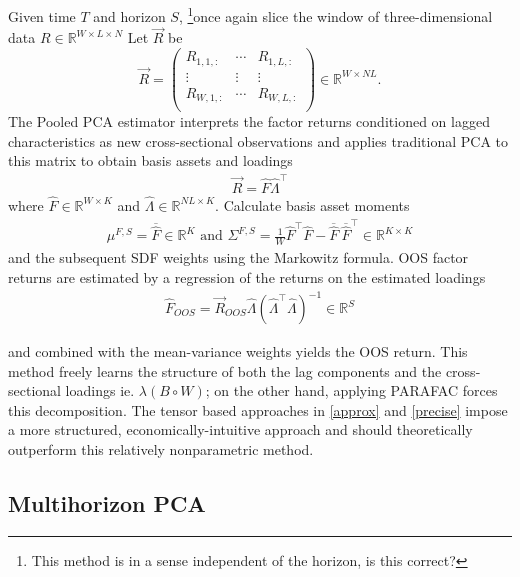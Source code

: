 \documentclass{article}
\newcommand{\R}{{\mathbb R}}
\begin{document}
Given time $T$ and horizon $S$, \footnote{This method is in a sense independent of the horizon, is this correct?}once again slice the window of three-dimensional data $R \in \R^{W \times L \times N}$ Let $\overrightarrow{R}$ be 
\[\overrightarrow{R} = \begin{pmatrix}
R_{1, 1, :} & \cdots & R_{1, L, :}\\
\vdots & \vdots & \vdots\\
R_{W, 1, :} & \cdots & R_{W, L, :}\\
\end{pmatrix}
\in \R^{W \times NL}.\]
The Pooled PCA estimator interprets the factor returns conditioned on lagged characteristics as new 
cross-sectional observations and applies traditional PCA to this matrix to obtain basis assets and loadings
\begin{align}
    \overrightarrow{R} = \widehat{F} \widehat{\Lambda}^\top
\end{align}
where $\widehat{F} \in \R^{W \times K}$ and $\widehat{\Lambda} \in \R^{NL \times K}$. Calculate basis asset moments
\begin{align}
    \mu^{F, S} = \overline{\widehat{F}} \in \R^K \text{ and } \Sigma^{F, S} = \frac{1}{W}\widehat{F}^\top \widehat{F} - \overline{\widehat{F}} \ \overline{\widehat{F}}^\top \in \R^{K \times K} \label{pca-moments}
\end{align}
and the subsequent SDF weights using the Markowitz formula. OOS factor returns are estimated by a regression 
of the returns on the estimated loadings 
\begin{align}
    \widehat{F}_{OOS} = \overrightarrow{R}_{OOS} \widehat{\Lambda} \left( \widehat{\Lambda}^\top \widehat{\Lambda}\right)^{-1} \in \R^{S} \label{pca-oos-regression}
\end{align}

and combined with the mean-variance weights yields the OOS return. This method freely learns the structure of both the lag components and the cross-sectional loadings ie. $\lambda (B \circ W)$; on the other hand, 
applying PARAFAC forces this decomposition. The tensor based approaches in 
\ref{approx} and \ref{precise} impose a more structured, economically-intuitive approach and should theoretically outperform
this relatively nonparametric method. 

\subsection{Multihorizon PCA} \label{multiperiod-pca}
\end{document}
